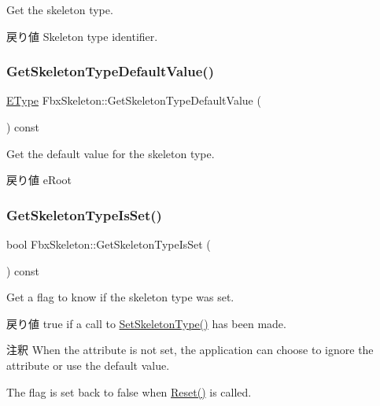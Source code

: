 Get the skeleton type. \begin{DoxyReturn}{戻り値}
Skeleton type identifier. 
\end{DoxyReturn}
\mbox{\label{class_fbx_skeleton_a1bff92888a3546492bf12c00b9b43e6e}} 
\subsubsection{\texorpdfstring{Get\+Skeleton\+Type\+Default\+Value()}{GetSkeletonTypeDefaultValue()}}
{\footnotesize\ttfamily \hyperlink{class_fbx_skeleton_ae067f8fec201e5e3572f039e37ee1c6b}{E\+Type} Fbx\+Skeleton\+::\+Get\+Skeleton\+Type\+Default\+Value (\begin{DoxyParamCaption}{ }\end{DoxyParamCaption}) const}

Get the default value for the skeleton type. \begin{DoxyReturn}{戻り値}
{\ttfamily e\+Root} 
\end{DoxyReturn}
\mbox{\label{class_fbx_skeleton_a50697039232e872c5c2a7beb281d55e6}} 
\subsubsection{\texorpdfstring{Get\+Skeleton\+Type\+Is\+Set()}{GetSkeletonTypeIsSet()}}
{\footnotesize\ttfamily bool Fbx\+Skeleton\+::\+Get\+Skeleton\+Type\+Is\+Set (\begin{DoxyParamCaption}{ }\end{DoxyParamCaption}) const}

Get a flag to know if the skeleton type was set. \begin{DoxyReturn}{戻り値}
{\ttfamily true} if a call to \hyperlink{class_fbx_skeleton_af74812971091ce9ece00a145d6f35d48}{Set\+Skeleton\+Type()} has been made. 
\end{DoxyReturn}
\begin{DoxyRemark}{注釈}
When the attribute is not set, the application can choose to ignore the attribute or use the default value. 

The flag is set back to {\ttfamily false} when \hyperlink{class_fbx_skeleton_a622069fcb67d773d755e96b321df1094}{Reset()} is called. 
\end{DoxyRemark}
\mbox{\label{class_fbx_skeleton_a8407f2dbece8af886d80b5a024626d54}} 
